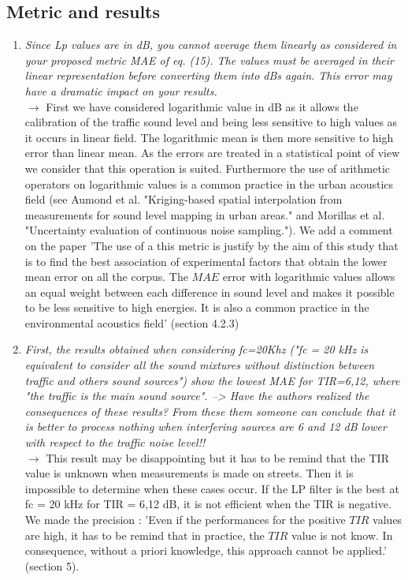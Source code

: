 \documentclass[10pt]{article}
\begin{document}
\subsection{Metric and results}

\begin{enumerate}
\item \emph{Since Lp values are in dB, you cannot average them linearly as considered in your proposed metric MAE of eq. (15). The values must be averaged in their linear representation before converting them into dBs again. This error may have a dramatic impact on your results.}\\
$\rightarrow$ First we have considered logarithmic value in dB as it allows the calibration of the traffic sound level and being less sensitive to high values as it occurs in linear field. 
The logarithmic mean is then more sensitive to high error than linear mean. As the errors are treated in a statistical point of view we consider that this operation is suited.
Furthermore the use of arithmetic operators on logarithmic values is a common practice in the urban acoustics field (see Aumond et al. "Kriging-based spatial interpolation from measurements for sound level mapping in urban areas." and Morillas et al. "Uncertainty evaluation of continuous noise sampling."). We add a comment on the paper 'The use of a this metric is justify by the aim of this study that is to find the best association of experimental factors that obtain the lower mean error on all the corpus. The $MAE$ error with logarithmic values allows an equal weight between each difference in sound level and makes it possible to be less sensitive to high energies. It is also a common practice in the environmental acoustics field' (section 4.2.3)

\item \emph{First, the results obtained when considering fc=20Khz ("fc = 20 kHz is equivalent to consider all the sound mixtures without distinction between traffic and others sound sources") show the lowest MAE for TIR={6,12}, where "the traffic is the main sound source". 
--> Have the authors realized the consequences of these results? From these them someone can conclude that it is better to process nothing when interfering sources are 6 and 12 dB lower with respect to the traffic noise level!!}\\
$\rightarrow$ This result may be disappointing but it has to be remind that the TIR value is unknown when measurements is made on streets. Then it is impossible to determine when these cases occur. If the LP filter is the best at fc = 20 kHz for TIR = {6,12} dB, it is not efficient when the TIR is negative. We made the precision : 
'Even if the performances for the positive $TIR$ values are high, it has to be remind that in practice, the $TIR$ value is not know. In consequence, without a priori knowledge, this approach cannot be applied.' (section 5).


\end{enumerate}
\end{document}
